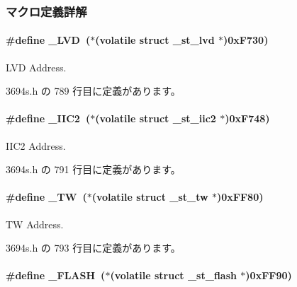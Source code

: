 \subsubsection{マクロ定義詳解}
\paragraph[{\+\_\+\+L\+V\+D}]{\setlength{\rightskip}{0pt plus 5cm}\#define \+\_\+\+L\+V\+D~($\ast$(volatile struct {\bf \+\_\+st\+\_\+lvd}   $\ast$)0x\+F730)}\label{3694s_8h_a9909b27f83a32cffb06cd71cf623801a_a9909b27f83a32cffb06cd71cf623801a}


L\+V\+D Address. 



 3694s.\+h の 789 行目に定義があります。

\paragraph[{\+\_\+\+I\+I\+C2}]{\setlength{\rightskip}{0pt plus 5cm}\#define \+\_\+\+I\+I\+C2~($\ast$(volatile struct {\bf \+\_\+st\+\_\+iic2}  $\ast$)0x\+F748)}\label{3694s_8h_aa5e499383e2ecd98923b7d330d629324_aa5e499383e2ecd98923b7d330d629324}


I\+I\+C2 Address. 



 3694s.\+h の 791 行目に定義があります。

\paragraph[{\+\_\+\+T\+W}]{\setlength{\rightskip}{0pt plus 5cm}\#define \+\_\+\+T\+W~($\ast$(volatile struct {\bf \+\_\+st\+\_\+tw}    $\ast$)0x\+F\+F80)}\label{3694s_8h_a97cdedef1f0e49c6b2704dd50afd6190_a97cdedef1f0e49c6b2704dd50afd6190}


T\+W Address. 



 3694s.\+h の 793 行目に定義があります。

\paragraph[{\+\_\+\+F\+L\+A\+S\+H}]{\setlength{\rightskip}{0pt plus 5cm}\#define \+\_\+\+F\+L\+A\+S\+H~($\ast$(volatile struct {\bf \+\_\+st\+\_\+flash} $\ast$)0x\+F\+F90)}\label{3694s_8h_a95b02c9549c0b2c0ffd21407561ec99c_a95b02c9549c0b2c0ffd21407561ec99c}


